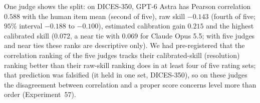 One judge shows the split: on DICES-350, GPT-6 Astra has Pearson correlation $0.588$ with the human item mean (second of five), raw skill $-0.143$ (fourth of five; $95\%$ interval $-0.188$ to $-0.100$), estimated calibration gain $0.215$ and the highest calibrated skill ($0.072$, a near tie with $0.069$ for Claude Opus 5.5; with five judges and near ties these ranks are descriptive only).
We had pre-registered that the correlation ranking of the five judges tracks their calibrated-skill (resolution) ranking better than their raw-skill ranking does in at least four of five rating sets; that prediction was falsified (it held in one set, DICES-350), so on these judges the disagreement between correlation and a proper score concerns level more than order (Experiment~57).
